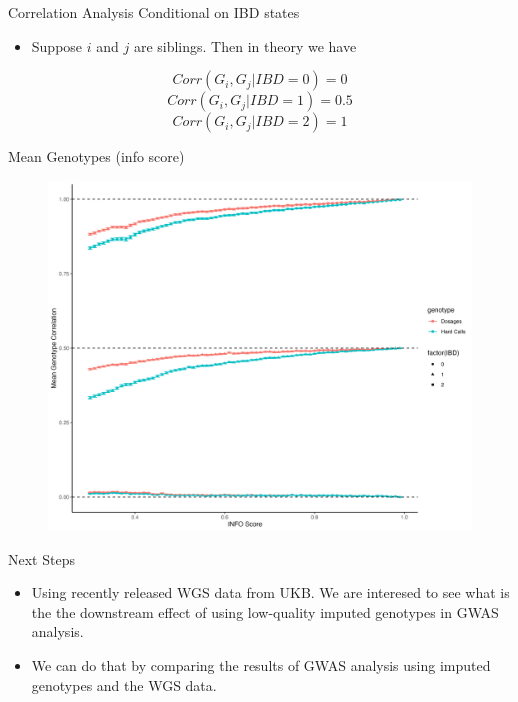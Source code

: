\documentclass{beamer}
\begin{document}
\begin{frame}{Correlation Analysis Conditional on IBD states}
      \begin{itemize}
            \item Suppose \(i\) and \(j\) are siblings. Then in theory we have
      \end{itemize}
      \[
            Corr(G_i, G_j | IBD = 0) = 0
      \]
      \[
            Corr(G_i, G_j | IBD = 1) = 0.5
      \]
      \[
            Corr(G_i, G_j | IBD = 2) = 1
      \]
\end{frame}

\begin{frame}{Mean Genotypes (info score)}
      \begin{figure}
            \includegraphics[width= .80\textwidth]{fig/mean_gt_by_ibd.png}
      \end{figure}
\end{frame}

\begin{frame}{Next Steps}
      \begin{itemize}
            \item Using recently released WGS data from UKB. We are interesed to see what is the 
            the downstream effect of using low-quality imputed genotypes in GWAS analysis.
            \item We can do that by comparing the results of GWAS analysis using imputed genotypes and the WGS data.
\end{itemize}
\end{frame}
\end{document}
